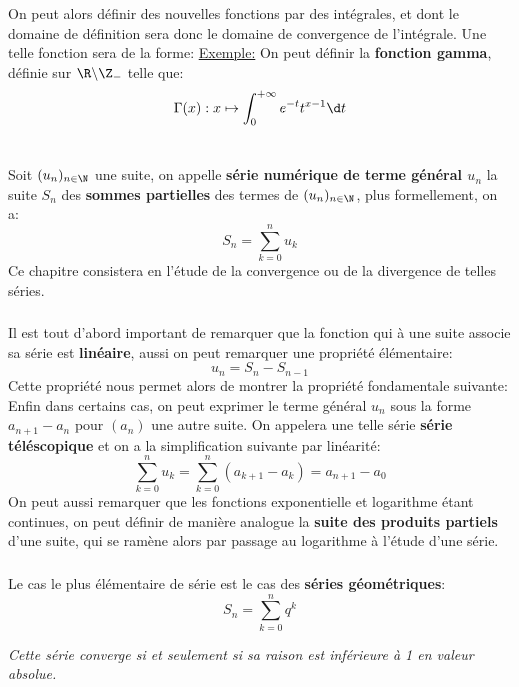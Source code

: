 \subsection*{}
On peut alors définir des nouvelles fonctions par des intégrales, et dont le domaine de définition sera donc le domaine de convergence de l'intégrale. Une telle fonction sera de la forme:
\underline{Exemple:} On peut définir la \textbf{fonction gamma}, définie sur \(\R \backslash \Z_-\) telle que:
\[
   \Gamma(x): x \mapsto \int_{0}^{+\infty} e^{-t}t^{x-1} \d t   
\]
\chapter*{}
Soit \((u_n)_{n\in\N}\) une suite, on appelle \textbf{série numérique de terme général \(u_n\)} la suite \(S_n\) des \textbf{sommes partielles} des termes de \((u_n)_{n\in\N}\), plus formellement, on a:
\[
   S_n = \sum_{k=0}^{n} u_k   
\]
Ce chapitre consistera en l'étude de la convergence ou de la divergence de telles séries. 
\subsection*{}
Il est tout d'abord important de remarquer que la fonction qui à une suite associe sa série est \textbf{linéaire}, aussi on peut remarquer une propriété élémentaire:
\[
   u_n = S_{n} - S_{n-1}   
\]
Cette propriété nous permet alors de montrer la propriété fondamentale suivante:
Enfin dans certains cas, on peut exprimer le terme général \(u_n\) sous la forme \(a_{n+1} - a_n\) pour \((a_n)\) une autre suite. On appelera une telle série \textbf{série téléscopique} et on a la simplification suivante par linéarité:
\[
   \sum_{k=0}^{n} u_k = \sum_{k=0}^{n} (a_{k+1} - a_k) = a_{n+1} - a_0   
\]
On peut aussi remarquer que les fonctions exponentielle et logarithme étant continues, on peut définir de manière analogue la \textbf{suite des produits partiels} d'une suite, qui se ramène alors par passage au logarithme à l'étude d'une série.
\subsection*{}
Le cas le plus élémentaire de série est le cas des \textbf{séries géométriques}:
\[
   S_n = \sum_{k=0}^{n} q^k
\]
\begin{center}
   \textit{Cette série converge si et seulement si sa raison est inférieure à 1 en valeur absolue.}
\end{center}

